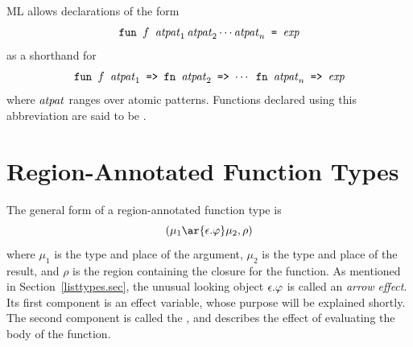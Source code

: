 \documentclass[12pt]{book}
\begin{document}
ML allows declarations of the form
$$\hbox{\tt fun $f$ ${\it atpat}_1\,{\it atpat}_2 \cdots {\it atpat}_n$ = $\hbox{\it exp}$}$$
as a shorthand for 
$$\hbox{\tt fun $f$ ${\it atpat}_1$ => fn ${\it atpat}_2$ => $\cdots$ fn ${\it atpat}_n$ => $\hbox{\it exp}$}$$
where ${\it atpat}$ ranges over atomic patterns.
Functions declared using this abbreviation are said to be . 

\section{Region-Annotated Function Types}
\label{functiontypes.sec}
The general form of a region-annotated 
%
function type is
$$(\mu_1\ar{\epsilon.\rea}\mu_2, \rho)$$
where $\mu_1$ is the
type and place of the argument, $\mu_2$ is the
type and place of the result, and $\rho$ is the region
containing the closure for the function.
As mentioned in Section~\ref{listtypes.sec}, the unusual looking object
$\epsilon.\varphi$ is called an 
%
{\em arrow effect}. Its first component
is an 
%
effect variable, whose purpose will be explained shortly.
The second component is called the , and describes
the effect of evaluating the body of the function. 
\end{document}
